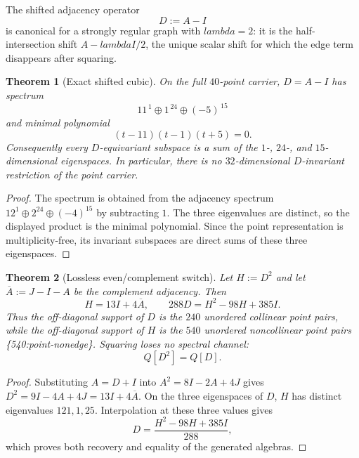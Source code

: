 \documentclass[12pt,a4paper]{article}
\def\mathbb#1{#1}%
\def\texttt#1{#1}%
\def\lambda{lambda}%
\newtheorem{theorem}{Theorem}[section]
\theoremstyle{definition}
\begin{document}
The shifted adjacency operator
\[
   D:=A-I
\]
is canonical for a strongly regular graph with $\lambda=2$: it is the
half-intersection shift $A-\lambda I/2$, the unique scalar shift for which
the edge term disappears after squaring.

\begin{theorem}[Exact shifted cubic]\label{thm:mastercubic}
On the full $40$-point carrier, $D=A-I$ has spectrum
\[
  11^{\,1}\oplus 1^{\,24}\oplus(-5)^{\,15}
\]
and minimal polynomial
\begin{equation}\label{eq:mastercubic}
  \boxed{(t-11)(t-1)(t+5)=0.}
\end{equation}
Consequently every $D$-equivariant subspace is a sum of the
$1$-, $24$-, and $15$-dimensional eigenspaces.  In particular, there is no
$32$-dimensional $D$-invariant restriction of the point carrier.
\end{theorem}

\begin{proof}
The spectrum is obtained from the adjacency spectrum
$12^1\oplus2^{24}\oplus(-4)^{15}$ by subtracting $1$.  The three
eigenvalues are distinct, so the displayed product is the minimal
polynomial.  Since the point representation is multiplicity-free, its
invariant subspaces are direct sums of these three eigenspaces.
\end{proof}

\begin{theorem}[Lossless even/complement switch]\label{thm:specdem}
Let $H:=D^2$ and let $\overline A:=J-I-A$ be the complement adjacency.
Then
\begin{equation}\label{eq:lossless-complement-switch}
  \boxed{H=13I+4\overline A,\qquad
  288D=H^2-98H+385I.}
\end{equation}
Thus the off-diagonal support of $D$ is the $240$ unordered collinear
point pairs, while the off-diagonal support of $H$ is the
$540$ unordered noncollinear point pairs
\texttt{\{540:point-nonedge\}}.  Squaring loses no spectral channel:
\[
  \mathbb Q[D^2]=\mathbb Q[D].
\]
\end{theorem}

\begin{proof}
Substituting $A=D+I$ into $A^2=8I-2A+4J$ gives
$D^2=9I-4A+4J=13I+4\overline A$.  On the three eigenspaces of $D$,
$H$ has distinct eigenvalues $121,1,25$.  Interpolation at these three
values gives
\[
  D=\frac{H^2-98H+385I}{288},
\]
which proves both recovery and equality of the generated algebras.
\end{proof}
\end{document}
